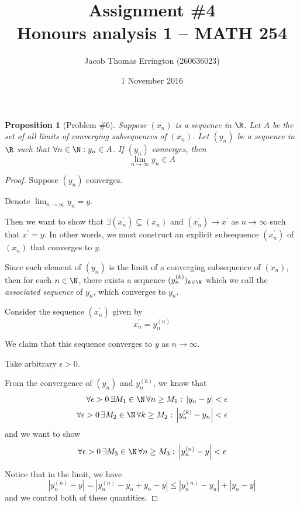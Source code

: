 \documentclass[11pt,letterpaper]{article}
\author{Jacob Thomas Errington (260636023)}
\title{Assignment \#4\\Honours analysis 1 -- MATH 254}
\date{1 November 2016}
\newcommand{\abs}[1]{\left|#1\right|}
\newcommand{\absdiff}[2]{\abs{#1 - #2}}
\newcommand{\convergence}[5]{
  \forall #1 > 0\,
  \exists #2 \in \N\,
  \forall #3 \geq #2:\,
  \absdiff{#4}{#5} < #1
}
\newtheorem{prop}{Proposition}
\begin{document}
\maketitle

\begin{prop}[Problem \#6]
  Suppose $(x_n)$ is a sequence in $\R$.
  Let $A$ be the set of all limits of converging subsequences of $(x_n)$.
  Let $(y_n)$ be a sequence in $\R$ such that $\forall n \in \N: y_n \in A$.
  If $(y_n)$ converges, then
  \begin{equation*}
    \lim_{n\to\infty} {y_n} \in A
  \end{equation*}
\end{prop}

\begin{proof}
  Suppose $(y_n)$ converges.

  Denote $\lim_{n\to\infty} {y_n} = y$.

  Then we want to show that $\exists (x^\prime_n) \subseteq (x_n)$ and
  $(x^\prime_n) \to x^\prime$ as $n \to \infty$ such that $x^\prime = y$.
  In other words, we must construct an explicit subsequence $(x^\prime_n)$ of
  $(x_n)$ that converges to $y$.

  Since each element of $(y_n)$ is the limit of a converging subsequence of
  $(x_n)$, then for each $n \in \N$, there exists a sequence
  $(y_n^{(k)})_{k \in \N}$ which we call the \emph{associated sequence} of
  $y_n$, which converges to $y_n$.

  Consider the sequence $(x^\prime_n)$ given by
  \begin{equation*}
    x^\prime_n = y_n^{(n)}
  \end{equation*}

  We claim that this sequence converges to $y$ as $n \to \infty$.

  Take arbitrary $\epsilon > 0$.

  From the convergence of $(y_n)$ and $y_n^{(k)}$, we know that
  \begin{align}
    \convergence{\epsilon}{M_1}{n}{y_n}{y} \label{eq:cvg-yn} \\
    \convergence{\epsilon}{M_2}{k}{y_n^{(k)}}{y_n} \label{eq:cvg-ynk}
  \end{align}
  and we want to show
  \begin{equation}
    \convergence{\epsilon}{M_3}{n}{y_n^{(n)}}{y} \label{eq:cvg-want}
  \end{equation}

  Notice that in the limit, we have
  \begin{equation}
    \abs{y_n^{(n)} - y}
    = \abs{y_n^{(n)} - y_n + y_n - y}
    \leq \absdiff{y_n^{(n)}}{y_n} + \absdiff{y_n}{y}
    \label{eq:tri-ineq-lim}
  \end{equation}
  and we control both of these quantities.


\end{proof}
\end{document}
